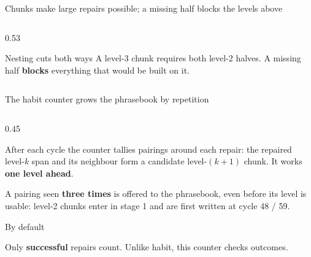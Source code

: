\documentclass[aspectratio=169,11pt]{beamer}
\newcommand{\hltext}[1]{\textcolor{mainblue}{\textbf{#1}}}
\begin{document}
\begin{frame}{Chunks make large repairs possible; a missing half blocks the levels above}
\begin{columns}[T]
\begin{column}{0.53\textwidth}
\medskip
\begin{block}{Nesting cuts both ways}
{\small A level-3 chunk requires both level-2 halves. A missing half \textbf{blocks} everything that would be built on it.}
\end{block}
\end{column}
\end{columns}
\end{frame}

\begin{frame}{The habit counter grows the phrasebook by repetition}
\begin{columns}[T]
\begin{column}{0.45\textwidth}
{\small After each cycle the counter tallies pairings around each repair: the repaired level-$k$ span and its neighbour form a candidate level-$(k{+}1)$ chunk. It works \hltext{one level ahead}.\par}

\smallskip
{\small A pairing seen \textbf{three times} is offered to the phrasebook, even before its level is usable: level-2 chunks enter in stage 1 and are first written at cycle 48 / 59.\par}

\smallskip
\begin{block}{By default}
{\small Only \textbf{successful} repairs count. Unlike habit, this counter checks outcomes.\par}
\end{block}
\end{column}


\end{columns}
\end{frame}
\end{document}
